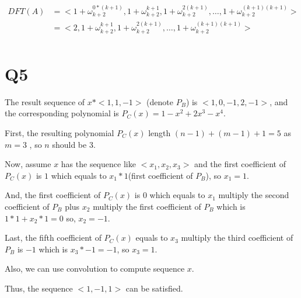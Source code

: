 \documentclass[a4paper]{article}
\begin{document}
	\begin{equation*}
		\begin{aligned}
		DFT(A) &= 
			<1+\omega_{k+2}^{0*(k+1)},1+\omega_{k+2}^{k+1},1+\omega_{k+2}^{2(k+1)},\dots,1+\omega_{k+2}^{(k+1)(k+1)}>\\ 
			&= <2,1+\omega_{k+2}^{k+1},1+\omega_{k+2}^{2(k+1)},\dots,1+\omega_{k+2}^{(k+1)(k+1)}>\\
		\end{aligned}
	\end{equation*}

	\section*{Q5}
	The result sequence of $x*<1,1,-1>$ (denote $P_B$) is $<1,0,-1,2,-1>$, and the corresponding polynomial is $P_C(x)=1-x^2+2x^3-x^4$.
	
	First, the resulting polynomial $P_C(x)$ length $(n-1)+(m-1)+1 = 5$ as $m=3$ , so $n$ should be $3$.
	
	Now, assume $x$ has the sequence like $<x_1, x_2, x_3>$ and the first coefficient of $P_C(x)$ is $1$ which equals to  $x_1 * 1$(first coefficient of $P_B$), so $x_1 = 1$.
	
	And, the first coefficient of $P_C(x)$ is 0 which equals to $x_1$ multiply the second coefficient of $P_B$ plus $x_2$ multiply the first coefficient of $P_B$ which is $1 * 1 + x_2 * 1 = 0$ so, $x_2 = -1$.
	
	Last, the fifth coefficient of $P_C(x)$ equals to $x_3$ multiply the third coefficient of $P_B$ is $-1$ which is $x_3 * -1 = -1$, so $x_3 = 1$.
	
	Also, we can use convolution to compute sequence $x$.
	
	Thus, the sequence $<1, -1, 1>$ can be satisfied.
	
	
	
	
	
	
	
	
	
	
	
	
	
	
	
	
	
	
	
	
	
	
	
	
	
	
\end{document}

